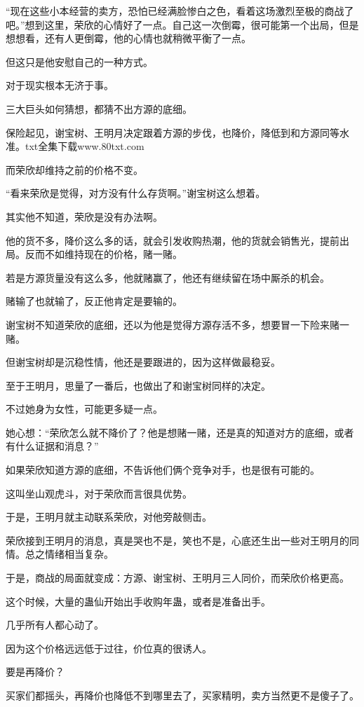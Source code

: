 \begin{this_body}
“现在这些小本经营的卖方，恐怕已经满脸惨白之色，看着这场激烈至极的商战了吧。”想到这里，荣欣的心情好了一点。自己这一次倒霉，很可能第一个出局，但是想想看，还有人更倒霉，他的心情也就稍微平衡了一点。

但这只是他安慰自己的一种方式。

对于现实根本无济于事。

三大巨头如何猜想，都猜不出方源的底细。

保险起见，谢宝树、王明月决定跟着方源的步伐，也降价，降低到和方源同等水准。txt全集下载www.80txt.com

而荣欣却维持之前的价格不变。

“看来荣欣是觉得，对方没有什么存货啊。”谢宝树这么想着。

其实他不知道，荣欣是没有办法啊。

他的货不多，降价这么多的话，就会引发收购热潮，他的货就会销售光，提前出局。反而不如维持现在的价格，赌一赌。

若是方源货量没有这么多，他就赌赢了，他还有继续留在场中厮杀的机会。

赌输了也就输了，反正他肯定是要输的。

谢宝树不知道荣欣的底细，还以为他是觉得方源存活不多，想要冒一下险来赌一赌。

但谢宝树却是沉稳性情，他还是要跟进的，因为这样做最稳妥。

至于王明月，思量了一番后，也做出了和谢宝树同样的决定。

不过她身为女性，可能更多疑一点。

她心想：“荣欣怎么就不降价了？他是想赌一赌，还是真的知道对方的底细，或者有什么证据和消息？”

如果荣欣知道方源的底细，不告诉他们俩个竞争对手，也是很有可能的。

这叫坐山观虎斗，对于荣欣而言很具优势。

于是，王明月就主动联系荣欣，对他旁敲侧击。

荣欣接到王明月的消息，真是哭也不是，笑也不是，心底还生出一些对王明月的同情。总之情绪相当复杂。

于是，商战的局面就变成：方源、谢宝树、王明月三人同价，而荣欣价格更高。

这个时候，大量的蛊仙开始出手收购年蛊，或者是准备出手。

几乎所有人都心动了。

因为这个价格远远低于过往，价位真的很诱人。

要是再降价？

买家们都摇头，再降价也降低不到哪里去了，买家精明，卖方当然更不是傻子了。


\end{this_body}
